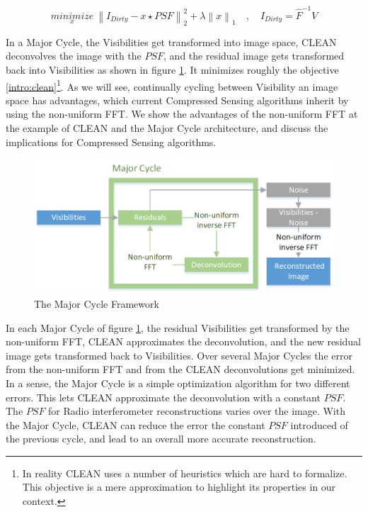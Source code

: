 \begin{equation}\label{intro:clean}
\underset{x}{minimize} \: \left \|  I_{Dirty} - x \star PSF \right \|_2^2 + \lambda \left \| x \right \|_1 \quad, \quad I_{Dirty} = \hat{F}^{-1} V
\end{equation}

In a Major Cycle, the Visibilities get transformed into image space, CLEAN deconvolves the image with the $PSF$, and the residual image gets transformed back into Visibilities as shown in figure \ref{intro:major}. It minimizes roughly the objective \eqref{intro:clean}\footnote{ In reality CLEAN uses a number of heuristics which are hard to formalize. This objective is a mere approximation to highlight its properties in our context.}. As we will see, continually cycling between Visibility an image space has advantages, which current Compressed Sensing algorithms inherit by using the non-uniform FFT. We show the advantages of the non-uniform FFT at the example of CLEAN and the Major Cycle architecture, and discuss the implications for Compressed Sensing algorithms.


\begin{figure}[h]
	\centering
	\includegraphics[width=0.80\linewidth]{./chapters/01.intro/Major-Minor.png}
	\caption{The Major Cycle Framework}
	\label{intro:major}
\end{figure}

In each Major Cycle of figure \ref{intro:major}, the residual Visibilities get transformed by the non-uniform FFT, CLEAN approximates the deconvolution, and the new residual image gets transformed back to Visibilities. Over several Major Cycles the error from the non-uniform FFT and from the CLEAN deconvolutions get minimized. In a sense, the Major Cycle is a simple optimization algorithm for two different errors. This lets CLEAN approximate the deconvolution with a constant $PSF$. The $PSF$ for Radio interferometer reconstructions varies over the image. With the Major Cycle, CLEAN can reduce the error the constant $PSF$ introduced of the previous cycle, and lead to an overall more accurate reconstruction.

